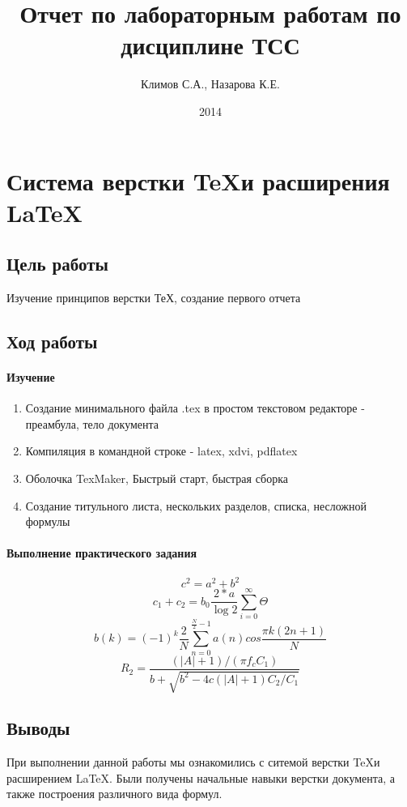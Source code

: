 \documentclass[10pt,a4paper]{article}
\author{Климов С.А., Назарова К.Е.}
\title{Отчет по лабораторным работам по дисциплине ТСС}
\date{2014}
\begin{document}
\maketitle
\pagebreak
\tableofcontents
\pagebreak
\section{Система верстки \TeX и расширения \LaTeX}
\subsection{Цель работы}
Изучение принципов верстки ТеХ, создание первого отчета
\subsection{Ход работы}
\paragraph{Изучение}
\begin{enumerate}
\item Создание минимального файла .tex в простом текстовом редакторе - преамбула, тело документа
\item Компиляция в командной строке - latex, xdvi, pdflatex
\item Оболочка TexMaker, Быстрый старт, быстрая сборка
\item Создание титульного листа, нескольких разделов, списка, несложной формулы
\end{enumerate}
\paragraph{Выполнение практического задания}
\begin{displaymath}
c^2 = a^2 + b^2
\end{displaymath}
\begin{equation}
c_1+c_2=b_0\frac{2*a}{\log2}
\sum_{i=0}^{\infty}\Theta
\end{equation}
\begin{equation}
b(k) = (-1)^k\frac{2}{N}\sum_{n=0}^{\frac{N}{2}-1}a(n)cos{\frac{\pi k(2n+1)}{N}}
\end{equation}
\begin{equation}
R_2=\frac{(|A|+1)/(\pi f_c C_1)}{b+\sqrt{b^2-4c(|A|+1)C_2/C_1}}
\end{equation}
\subsection{Выводы}
При выполнении данной работы мы ознакомились с ситемой верстки \TeX  и расширением \LaTeX. Были получены начальные навыки верстки документа, а также построения различного вида формул.
\end{document}
